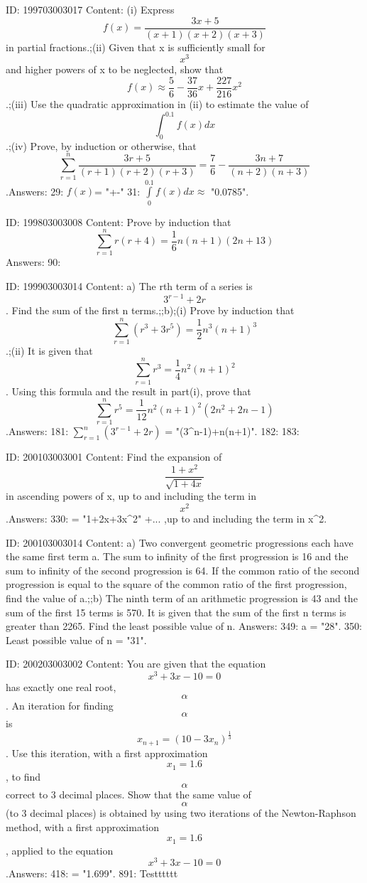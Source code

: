 \documentclass{article}
\begin{document}
ID: 199703003017
Content:
(i) Express \[f(x) = \frac {3x + 5}{(x + 1)(x + 2)(x + 3)}\] in partial fractions.;(ii) Given that x is sufficiently small for \[x^{3}\] and higher powers of x to be neglected, show that \[f(x) \approx \frac {5}{6} - \frac {37}{36}x + \frac {227}{216}x^{2}\].;(iii) Use the quadratic approximation in (ii) to estimate the value of \[\int_{0}^{0.1} f(x)dx\].;(iv) Prove, by induction or otherwise, that \[\sum_{r=1}^{n} \frac {3r + 5}{(r+1)(r+2)(r+3)} = \frac {7}{6} - \frac {3n + 7}{(n+2)(n+3)}\].Answers:
29: $f(x)$= "+-"
31: $\int \limits_{0}^{0.1}{f\left( x \right) dx} \approx$ "0.0785".

ID: 199803003008
Content:
Prove by induction that $$\sum^n_{r = 1} r( r + 4 ) = \frac{1}{6}n( n + 1 )( 2n + 13 )$$Answers:
90: 

ID: 199903003014
Content:
a) The rth term of a series is \[3^{r-1} + 2r\]. Find the sum of the first n terms.;;b);(i) Prove by induction that \[\sum_{r = 1}^{n} (r^3 + 3r^5) = \frac {1}{2} n^3(n + 1)^3\].;(ii) It is given that \[\sum_{r=1}^{n} r^3 = \frac {1}{4}n^2 (n+1)^2\]. Using this formula and the result in part(i), prove that \[\sum_{r=1}^{n} r^5 = \frac {1}{12}n^2 (n+1)^2 (2n^2 + 2n - 1)\].Answers:
181: $\sum\limits_{r=1}^{n}{\left({{3}^{r-1}}+2r\right)}$ = "(3^n-1)+n(n+1)".
182: 
183: 

ID: 200103003001
Content:
Find the expansion of  $$\frac{1 + x^2 }{\sqrt {1 + 4x}}$$ in ascending powers of x, up to and including the term in  $$x^2 $$.Answers:
330:  = "1+2x+3x^2" +... ,up to and including the term in x^2.

ID: 200103003014
Content:
a) Two convergent geometric progressions each have the same first term a. The sum to infinity of the first progression is 16 and the sum to infinity of the second progression is 64. If the common ratio of the second   progression is equal to the square of the common ratio of the first progression, find the value of a.;;b) The ninth term of an arithmetic progression is 43 and the sum of the first 15 terms is 570. It is given that the sum of the first n terms is greater than 2265. Find the least possible value of n. Answers:
349: a = "28".
350: Least possible value of n = "31".

ID: 200203003002
Content:
You are given that the equation  $$x^3  + 3x - 10 = 0$$ has exactly one real root,  $$\alpha $$. An iteration for finding  $$\alpha $$ is  $$x_{n + 1}  = (10 - 3x_n  )^{\frac{1}{3}} $$. Use this iteration, with a first approximation  $$x_1  = 1.6$$, to find  $$\alpha $$ correct to 3 decimal places. Show that the same value of  $$\alpha $$ (to 3 decimal places) is obtained by using two iterations of the Newton-Raphson method, with a first approximation  $$x_1 = 1.6$$, applied to the equation  $$x^3  + 3x - 10 = 0$$.Answers:
418: \alpha = "1.699".
891: Testttttt
\end{document}
